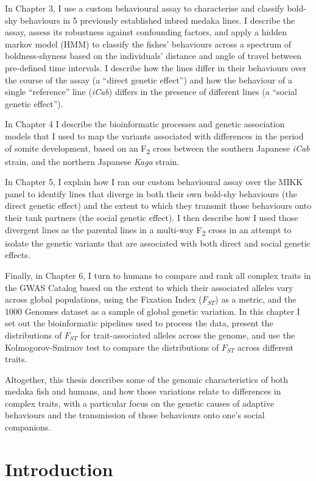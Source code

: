 \documentclass[
]{book}
\begin{document}
In Chapter 3, I use a custom behavioural assay to characterise and classify bold-shy behaviours in 5 previously established inbred medaka lines. I describe the assay, assess its robustness against confounding factors, and apply a hidden markov model (HMM) to classify the fishes' behaviours across a spectrum of boldness-shyness based on the individuals' distance and angle of travel between pre-defined time intervals. I describe how the lines differ in their behaviours over the course of the assay (a ``direct genetic effect'') and how the behaviour of a single ``reference'' line (\emph{iCab}) differs in the presence of different lines (a ``social genetic effect'').

In Chapter 4 I describe the bioinformatic processes and genetic association models that I used to map the variants associated with differences in the period of somite development, based on an F\textsubscript{2} cross between the southern Japanese \emph{iCab} strain, and the northern Japanese \emph{Kaga} strain.

In Chapter 5, I explain how I ran our custom behavioural assay over the MIKK panel to identify lines that diverge in both their own bold-shy behaviours (the direct genetic effect) and the extent to which they transmit those behaviours onto their tank partners (the social genetic effect). I then describe how I used those divergent lines as the parental lines in a multi-way F\textsubscript{2} cross in an attempt to isolate the genetic variants that are associated with both direct and social genetic effects.

Finally, in Chapter 6, I turn to humans to compare and rank all complex traits in the GWAS Catalog based on the extent to which their associated alleles vary across global populations, using the Fixation Index (\(F_{ST}\)) as a metric, and the 1000 Genomes dataset as a sample of global genetic variation. In this chapter I set out the bioinformatic pipelines used to process the data, present the distributions of \(F_{ST}\) for trait-associated alleles across the genome, and use the Kolmogorov-Smirnov test to compare the distributions of \(F_{ST}\) across different traits.

Altogether, this thesis describes some of the genomic characteristics of both medaka fish and humans, and how those variations relate to differences in complex traits, with a particular focus on the genetic causes of adaptive behaviours and the transmission of those behaviours onto one's social companions.

\hypertarget{Introduction}{%
\chapter{Introduction}\label{Introduction}}
\end{document}
